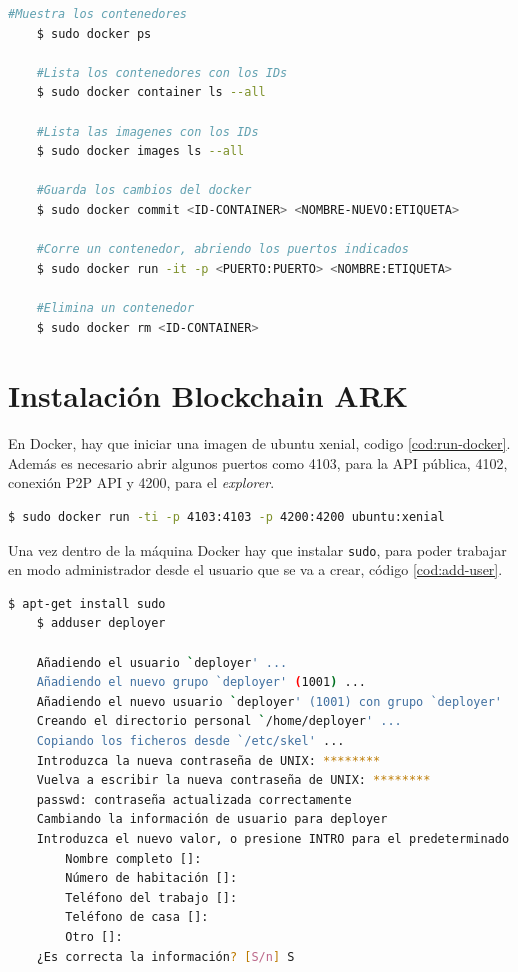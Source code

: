 \begin{lstlisting}[language=Bash,caption=Comandos útiles de Docker, label=cod:cm-docker]
	#Muestra los contenedores
	$ sudo docker ps

	#Lista los contenedores con los IDs
	$ sudo docker container ls --all

	#Lista las imagenes con los IDs
	$ sudo docker images ls --all 

	#Guarda los cambios del docker
	$ sudo docker commit <ID-CONTAINER> <NOMBRE-NUEVO:ETIQUETA>

	#Corre un contenedor, abriendo los puertos indicados
	$ sudo docker run -it -p <PUERTO:PUERTO> <NOMBRE:ETIQUETA>

	#Elimina un contenedor
	$ sudo docker rm <ID-CONTAINER>
\end{lstlisting}

\section{Instalación Blockchain ARK}

En Docker, hay que iniciar una imagen de ubuntu xenial, codigo \ref{cod:run-docker}. Además es necesario abrir algunos puertos como 4103, para la API pública, 4102, conexión P2P API y 4200, para el \textit{explorer}.\\

\begin{lstlisting}[language=Bash,caption=Instalación \textit{blockchain}. Parte I, label=cod:run-docker, style=Consola]
	$ sudo docker run -ti -p 4103:4103 -p 4200:4200 ubuntu:xenial
\end{lstlisting}

Una vez dentro de la máquina Docker hay que instalar \texttt{sudo}, para poder trabajar en modo administrador desde el usuario que se va a crear, código \ref{cod:add-user}.\\

\begin{lstlisting}[language=Bash,caption=Instalación \textit{blockchain}. Parte II, label=cod:add-user, style=Consola]
	$ apt-get install sudo
	$ adduser deployer

	Añadiendo el usuario `deployer' ...
	Añadiendo el nuevo grupo `deployer' (1001) ...
	Añadiendo el nuevo usuario `deployer' (1001) con grupo `deployer' ...
	Creando el directorio personal `/home/deployer' ...
	Copiando los ficheros desde `/etc/skel' ...
	Introduzca la nueva contraseña de UNIX: ********
	Vuelva a escribir la nueva contraseña de UNIX: ********
	passwd: contraseña actualizada correctamente
	Cambiando la información de usuario para deployer
	Introduzca el nuevo valor, o presione INTRO para el predeterminado
		Nombre completo []: 
		Número de habitación []: 
		Teléfono del trabajo []: 
		Teléfono de casa []: 
		Otro []: 
	¿Es correcta la información? [S/n] S
\end{lstlisting}

